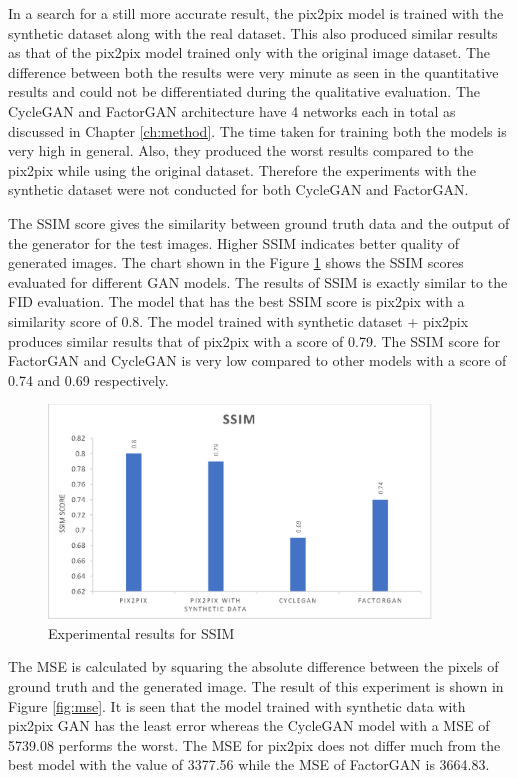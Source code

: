 In a search for a still more accurate result, the pix2pix model is trained with the synthetic dataset along with the real dataset. This also produced similar results as that of the pix2pix model trained only with the original image dataset. The difference between both the results were very minute as seen in the quantitative results and could not be differentiated during the qualitative evaluation. The CycleGAN and FactorGAN architecture have 4 networks each in total as discussed in Chapter \ref{ch:method}. The time taken for training both the models is very high in general. Also, they produced the worst results compared to the pix2pix while using the original dataset. Therefore the experiments with the synthetic dataset were not conducted for both CycleGAN and FactorGAN.  
\newline
	
	The SSIM score gives the similarity between ground truth data and the output of the generator for the test images. Higher SSIM indicates better quality of generated images. The chart shown in the Figure \ref{fig:ssim} shows the SSIM scores evaluated for different GAN models. The results of SSIM is exactly similar to the FID evaluation. The model that has the best SSIM score is pix2pix with a similarity score of 0.8. The model trained with synthetic dataset + pix2pix produces similar results that of pix2pix with a score of 0.79. The SSIM score for FactorGAN and CycleGAN is very low compared to other models with a score of 0.74 and 0.69 respectively.

\begin{figure}[H]
\centering
\includegraphics[width=4in]{images/ssim.eps}
\caption{Experimental results for SSIM}
\label{fig:ssim}
\end{figure}

	The MSE is calculated by squaring the absolute difference between the pixels of ground truth and the generated image. The result of this experiment is shown in Figure \ref{fig:mse}. It is seen that the model trained with synthetic data with pix2pix GAN has the least error whereas the CycleGAN model with a MSE of 5739.08 performs the worst. The MSE for pix2pix does not differ much from the best model with the value of 3377.56 while the MSE of FactorGAN is 3664.83.

